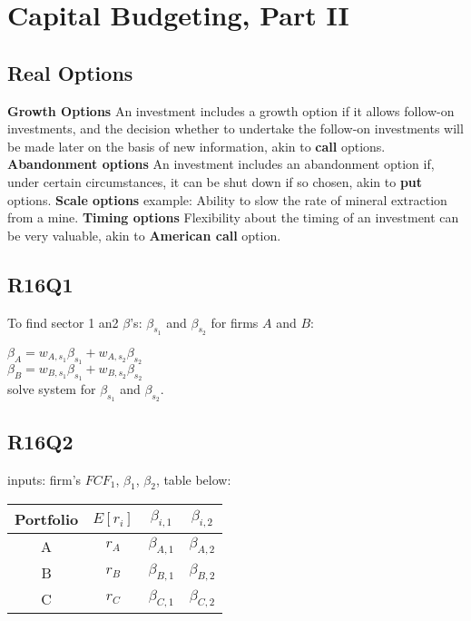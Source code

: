 \section{Capital Budgeting, Part II}

\subsection{Real Options}

{\bf Growth Options}  An investment includes a growth option if it allows follow-on investments,
and the decision whether to undertake the follow-on investments will be
made later on the basis of new information, akin to {\bf call} options. \\
{\bf Abandonment options} An investment includes an abandonment option if, under
certain circumstances, it can be shut down if so chosen, akin to {\bf put} options.
{\bf Scale options } example: Ability to slow the rate of mineral extraction from a mine.
{\bf Timing options} Flexibility about the timing of an investment can
be very valuable, akin to {\bf American call} option.



\subsection*{R16Q1}
To find sector 1 an2 $\beta$'s: $\beta_{s_1}$ and $\beta_{s_2}$ for firms $A$ and $B$:

$\beta_{A} = w_{A,s_1} \beta_{s_1} +  w_{A,s_2}  \beta_{s_2}  $ \\
$\beta_{B} = w_{B,s_1} \beta_{s_1} +  w_{B,s_2}  \beta_{s_2}  $ \\

solve system for  $\beta_{s_1}$ and $\beta_{s_2}$.

\subsection*{R16Q2}

inputs: firm's $FCF_1$,  $\beta_1$, $\beta_2$, table below:
\begin{center}
	\begin{tabular}{ |c|c|c|c| } 
		\hline
		Portfolio & $E[r_i]$ & $\beta_{i,1}$ & $\beta_{i,2}$ \\ 
		\hline
		A & $r_A$ & $\beta_{A,1}$ &  $\beta_{A,2}$ \\ 
		B & $r_B$ & $\beta_{B,1}$ &  $\beta_{B,2}$ \\ 
		C & $r_C$ & $\beta_{C,1}$ &  $\beta_{C,2}$ \\ 
		\hline
	\end{tabular}
\end{center}

